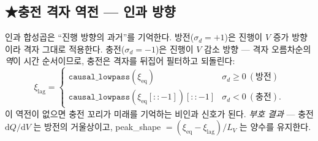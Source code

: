 \documentclass[11pt,a4paper]{article}
\newcommand{\dd}{\mathrm{d}}
\newcommand{\eq}{\mathrm{eq}}
\newcommand{\code}[1]{\texttt{#1}}
\begin{document}
\subsection{★충전 격자 역전 — 인과 방향}

인과 합성곱은 ``진행 방향의 과거''를 기억한다. 방전($\sigma_d=+1$)은 진행이 $V$ 증가 방향이라 격자 그대로 적용한다. 충전($\sigma_d=-1$)은 진행이 $V$ 감소 방향 — 격자 오름차순의 \emph{역}이 시간 순서이므로, 충전은 격자를 뒤집어 필터하고 되돌린다:
\begin{equation}
\xi_\mathrm{lag}=
\begin{cases}
\code{causal\_lowpass}(\xi_\eq) & \sigma_d\ge0\ (\text{방전})\\[2pt]
\code{causal\_lowpass}(\xi_\eq[::-1])[::-1] & \sigma_d<0\ (\text{충전}).
\end{cases}
\label{eq:reversal}
\end{equation}
이 역전이 없으면 충전 꼬리가 미래를 기억하는 비인과 신호가 된다. \emph{부호 결과} — 충전 $\dd Q/\dd V$ 는 방전의
거울상이고, peak\_shape $=(\xi_\eq-\xi_\mathrm{lag})/L_V$ 는 양수를 유지한다.
\end{document}

